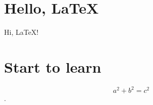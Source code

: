 \documentclass{article}
\begin{document}
\section{Hello, \LaTeX}
Hi, \LaTeX !
\section{Start to learn}
$$a^2 + b^2 = c^2$$.
\end{document}
